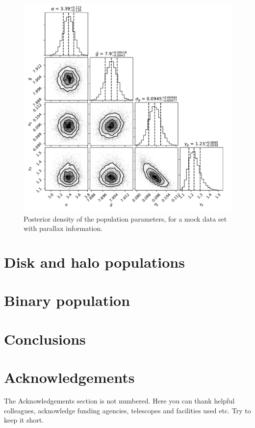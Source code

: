 \documentclass[fleqn,usenatbib]{mnras}
\begin{document}
\begin{figure}
	\includegraphics[width=.8\textwidth]{toy_chain_include-parallax_40-40.pdf}
    \caption{Posterior density of the population parameters, for a mock data set with parallax information.}
    \label{fig:chain_parallax}
\end{figure}




\section{Disk and halo populations}



\section{Binary population}



\section{Conclusions}



\section*{Acknowledgements}

The Acknowledgements section is not numbered. Here you can thank helpful
colleagues, acknowledge funding agencies, telescopes and facilities used etc.
Try to keep it short.
\end{document}
